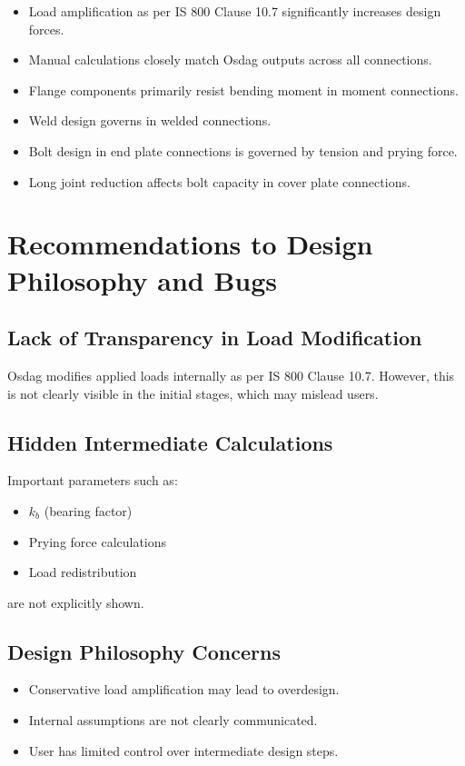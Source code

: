 \documentclass[12pt]{report}
\begin{document}
\begin{itemize}
\item Load amplification as per IS 800 Clause 10.7 significantly increases design forces.
\item Manual calculations closely match Osdag outputs across all connections.
\item Flange components primarily resist bending moment in moment connections.
\item Weld design governs in welded connections.
\item Bolt design in end plate connections is governed by tension and prying force.
\item Long joint reduction affects bolt capacity in cover plate connections.
\end{itemize}

\chapter{Recommendations to Design Philosophy and Bugs}

\section{Lack of Transparency in Load Modification}
Osdag modifies applied loads internally as per IS 800 Clause 10.7. However, this is not clearly visible in the initial stages, which may mislead users.

\section{Hidden Intermediate Calculations}
Important parameters such as:
\begin{itemize}
\item $k_b$ (bearing factor)
\item Prying force calculations
\item Load redistribution
\end{itemize}
are not explicitly shown.

\section{Design Philosophy Concerns}
\begin{itemize}
\item Conservative load amplification may lead to overdesign.
\item Internal assumptions are not clearly communicated.
\item User has limited control over intermediate design steps.
\end{itemize}
\end{document}
